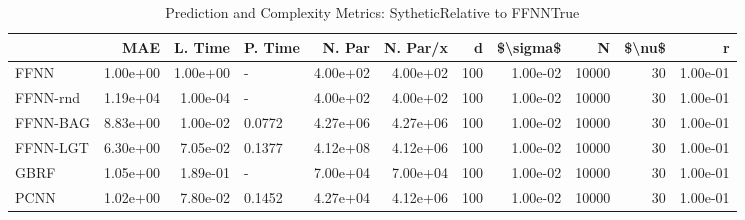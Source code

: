\begin{table}
\centering
\caption{Prediction and Complexity Metrics: SytheticRelative to FFNNTrue}
\label{tab__Sythetic__Fix_Neurons_QTrue}
\begin{tabular}{lrrlrrrrrrr}
\toprule
{} &      MAE &  L. Time & P. Time &   N. Par &  N. Par/x &    d &  \$\textbackslash sigma\$ &      N &  \$\textbackslash nu\$ &        r \\
\midrule
FFNN     & 1.00e+00 & 1.00e+00 &       - & 4.00e+02 &  4.00e+02 &  100 &  1.00e-02 &  10000 &     30 & 1.00e-01 \\
FFNN-rnd & 1.19e+04 & 1.00e-04 &       - & 4.00e+02 &  4.00e+02 &  100 &  1.00e-02 &  10000 &     30 & 1.00e-01 \\
FFNN-BAG & 8.83e+00 & 1.00e-02 &  0.0772 & 4.27e+06 &  4.27e+06 &  100 &  1.00e-02 &  10000 &     30 & 1.00e-01 \\
FFNN-LGT & 6.30e+00 & 7.05e-02 &  0.1377 & 4.12e+08 &  4.12e+06 &  100 &  1.00e-02 &  10000 &     30 & 1.00e-01 \\
GBRF     & 1.05e+00 & 1.89e-01 &       - & 7.00e+04 &  7.00e+04 &  100 &  1.00e-02 &  10000 &     30 & 1.00e-01 \\
PCNN     & 1.02e+00 & 7.80e-02 &  0.1452 & 4.27e+04 &  4.12e+06 &  100 &  1.00e-02 &  10000 &     30 & 1.00e-01 \\
\bottomrule
\end{tabular}
\end{table}
